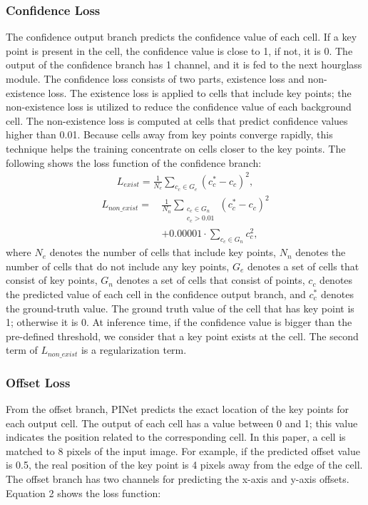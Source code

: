 \documentclass[journal]{IEEEtran}
\begin{document}
\subsubsection{Confidence Loss}
The confidence output branch predicts the confidence value of each cell. If a key point is present in the cell, the confidence value is close to 1, if not, it is 0. The output of the confidence branch has 1 channel, and it is fed to the next hourglass module. The confidence loss consists of two parts, existence loss and non-existence loss. The existence loss is applied to cells that include key points; the non-existence loss is utilized to reduce the confidence value of each background cell. The non-existence loss is computed at cells that predict confidence values higher than 0.01. Because cells away from key points converge rapidly, this technique helps the training concentrate on cells closer to the key points. The following shows the loss function of the confidence branch:
\begin{equation}
    \begin{aligned}
        L_{exist} = \frac{1}{N_{e}} \sum_{c_c \in G_{e}}{(c_c^*-c_c)}^2 ,
    \end{aligned}
\end{equation}
\begin{equation}
    \begin{aligned}
        L_{non\_exist} = \, &\frac{1}{N_{n}} \sum_{\substack{c_c \in G_{n} \\ c_c > 0.01}}{(c_c^*-c_c)^2} 
        \\
        & + 0.00001 \cdot \sum_{c_c \in G_{n}}{c_c^2} ,
    \end{aligned}
\end{equation}
where $N_{e}$ denotes the number of cells that include key points, $N_{n}$ denotes the number of cells that do not include any key points, $G_e$ denotes a set of cells that consist of key points, $G_n$ denotes a set of cells that consist of points, $c_c$ denotes the predicted value of each cell in the confidence output branch, and $c_c^*$ denotes the ground-truth value. The ground truth value of the cell that has key point is 1; otherwise it is 0. At inference time, if the confidence value is bigger than the pre-defined threshold, we consider that a key point exists at the cell. The second term of $L_{non\_exist}$ is a regularization term.

\subsubsection{Offset Loss}
From the offset branch, PINet predicts the exact location of the key points for each output cell. The output of each cell has a value between 0 and 1; this value indicates the position related to the corresponding cell. In this paper, a cell is matched to 8 pixels of the input image. For example, if the predicted offset value is 0.5, the real position of the key point is 4 pixels away from the edge of the cell. The offset branch has two channels for predicting the x-axis and y-axis offsets. Equation 2 shows the loss function:
\end{document}
